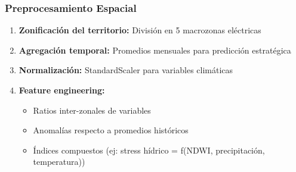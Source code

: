 \documentclass[12pt,a4paper]{article}
\begin{document}
\subsubsection{Preprocesamiento Espacial}
\begin{enumerate}
    \item \textbf{Zonificación del territorio:} División en 5 macrozonas eléctricas
    \item \textbf{Agregación temporal:} Promedios mensuales para predicción estratégica
    \item \textbf{Normalización:} StandardScaler para variables climáticas
    \item \textbf{Feature engineering:}
    \begin{itemize}
        \item Ratios inter-zonales de variables
        \item Anomalías respecto a promedios históricos
        \item Índices compuestos (ej: stress hídrico = f(NDWI, precipitación, temperatura))
    \end{itemize}
\end{enumerate}
\end{document}
